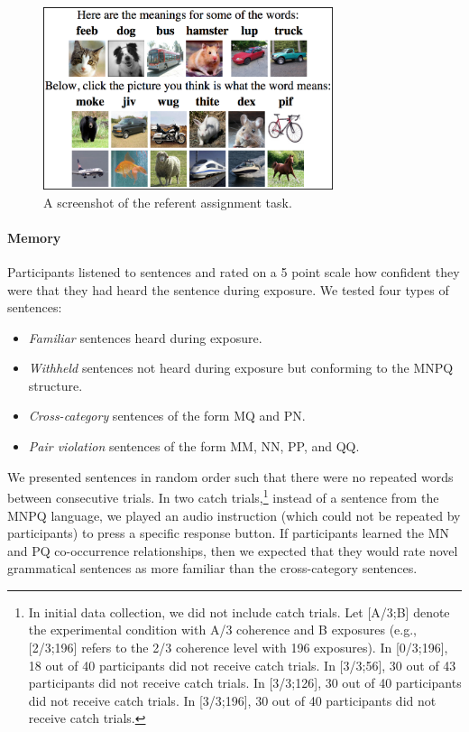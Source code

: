\documentclass[man,floatsintext]{apa6}
\begin{document}
\begin{figure}[t]
  \begin{center}
    \includegraphics[width=8.5cm]{meaning-html-cropped.png}
    \caption{A screenshot of the referent assignment task.}
    \label{meaning-task}
  \end{center}
\end{figure}

\paragraph{Memory}
Participants listened to sentences and rated on a 5 point scale how confident they were that they had heard the sentence during exposure. We tested four types of sentences:

\begin{itemize}
\item \emph{Familiar} sentences heard during exposure.
\item \emph{Withheld} sentences not heard during exposure but
conforming to the MNPQ structure.
\item \emph{Cross-category} sentences of the form MQ and PN.
\item \emph{Pair violation} sentences of the form MM, NN, PP, and
QQ.
\end{itemize}

We presented sentences in random order such that there were no repeated words between consecutive trials. In two catch trials,\footnote{\label{catch-trials} In initial data collection, we did not include catch trials.  Let [A/3;B] denote the experimental condition with A/3 coherence and B exposures (e.g., [2/3;196] refers to the 2/3 coherence level with 196 exposures). In [0/3;196], 18 out of 40 participants did not receive catch trials. In [3/3;56], 30 out of 43 participants did not receive catch trials. In [3/3;126], 30 out of 40 participants did not receive catch trials. In [3/3;196], 30 out of 40 participants did not receive catch trials.} instead of a sentence from the MNPQ language, we played an audio instruction (which could not be repeated by participants) to press a specific response button.  If participants learned the MN and PQ co-occurrence relationships, then we expected that they would rate novel grammatical sentences as more familiar than the cross-category sentences.
\end{document}

